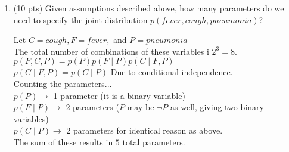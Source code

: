 \documentclass[11pt]{article}
\begin{document}
\begin{enumerate}
\begin{answertext}{6cm}{}
\end{answertext} 

\newpage

\item (10 pts) Given assumptions described above, how many parameters do we need to specify the joint distribution $p(fever, cough, pneumonia)$?  \\
\begin{answertext}{6cm}{}

Let $C = cough, F = fever,$ and $P = pneumonia$\\
The total number of combinations of these variables i $2^3 = 8$.\\
$p(F, C, P) = p(P)p(F \mid P)p(C \mid F, P)$\\
$p(C \mid F, P) = p(C \mid P)$ Due to conditional independence.\\
Counting the parameters...\\
$p(P) \rightarrow $ 1 parameter (it is a binary variable)\\
$p(F \mid P) \rightarrow $ 2 parameters ($P$ may be $\lnot P$ as well, giving two binary variables)\\
$p(C \mid P) \rightarrow $ 2 parameters for identical reason as above.\\
The sum of these results in $5$ total parameters.
        
\end{answertext} 
\end{enumerate}


\pagebreak
\end{document}
